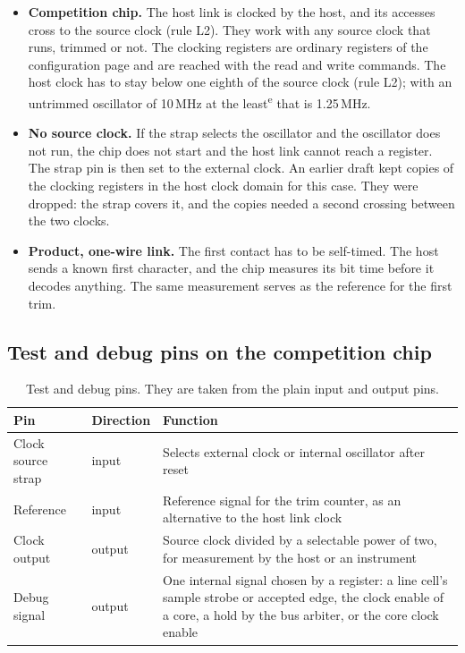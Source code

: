 \documentclass[10pt,a4paper]{article}
\newcommand{\est}{\textsuperscript{e}}
\begin{document}
\begin{itemize}
\item \textbf{Competition chip.} The host link is clocked by the host, and its accesses cross to the source
clock (rule L2). They work with any source clock that runs, trimmed or not. The clocking registers are
ordinary registers of the configuration page and are reached with the read and write commands. The host
clock has to stay below one eighth of the source clock (rule L2); with an untrimmed oscillator of 10\,MHz at the least\est{}
that is 1.25\,MHz.
\item \textbf{No source clock.} If the strap selects the oscillator and the oscillator does not run, the chip
does not start and the host link cannot reach a register. The strap pin is then set to the external clock. An
earlier draft kept copies of the clocking registers in the host clock domain for this case. They were dropped:
the strap covers it, and the copies needed a second crossing between the two clocks.
\item \textbf{Product, one-wire link.} The first contact has to be self-timed. The host sends a known first
character, and the chip measures its bit time before it decodes anything. The same measurement serves as the
reference for the first trim.
\end{itemize}

\subsection{Test and debug pins on the competition chip}

\begin{table}[H]
\centering\small
\begin{tabularx}{\linewidth}{@{}llL@{}}
\toprule
Pin & Direction & Function \\
\midrule
Clock source strap & input & Selects external clock or internal oscillator after reset \\
Reference & input & Reference signal for the trim counter, as an alternative to the host link clock \\
Clock output & output & Source clock divided by a selectable power of two, for measurement by the host or an instrument \\
Debug signal & output & One internal signal chosen by a register: a line cell's sample strobe or accepted edge, the clock enable of a core, a hold by the bus arbiter, or the core clock enable \\
\bottomrule
\end{tabularx}
\caption{Test and debug pins. They are taken from the plain input and output pins.}
\end{table}
\end{document}
